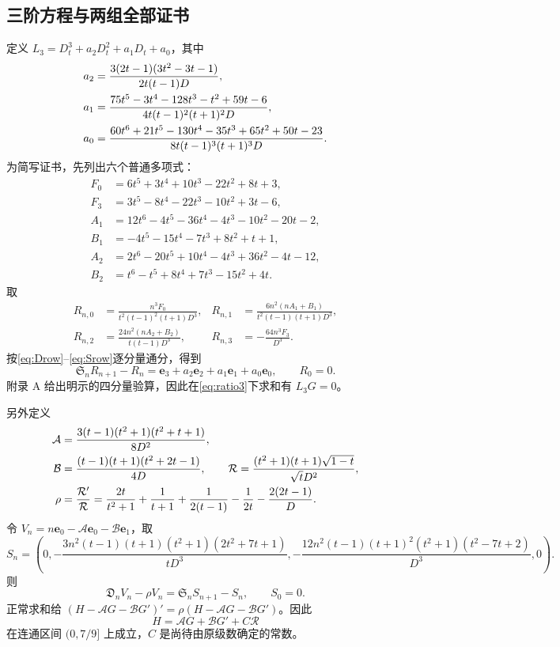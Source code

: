 \documentclass[11pt,a4paper]{article}
\numberwithin{equation}{section}
\theoremstyle{remark}\newtheorem{remark}[theorem]{说明}
\newcommand{\ee}{\boldsymbol e}
\newcommand{\RR}{\mathcal R}
\newcommand{\Afun}{\mathcal A}
\newcommand{\BB}{\mathcal B}
\newcommand{\Dop}{\mathfrak D}
\newcommand{\Sop}{\mathfrak S}
\begin{document}
\subsection{三阶方程与两组全部证书}
定义 $L_3=D_t^3+a_2D_t^2+a_1D_t+a_0$，其中
\begin{align}
 a_2&=\frac{3(2t-1)(3t^2-3t-1)}{2t(t-1)D},\notag\\
 a_1&=\frac{75t^5-3t^4-128t^3-t^2+59t-6}{4t(t-1)^2(t+1)^2D},\label{eq:L3}\\
 a_0&=\frac{60t^6+21t^5-130t^4-35t^3+65t^2+50t-23}{8t(t-1)^3(t+1)^3D}.\notag
\end{align}
为简写证书，先列出六个普通多项式：
\begin{align*}
 F_0&=6t^5+3t^4+10t^3-22t^2+8t+3,\\
 F_3&=3t^5-8t^4-22t^3-10t^2+3t-6,\\
 A_1&=12t^6-4t^5-36t^4-4t^3-10t^2-20t-2,\\
 B_1&=-4t^5-15t^4-7t^3+8t^2+t+1,\\
 A_2&=2t^6-20t^5+10t^4-4t^3+36t^2-4t-12,\\
 B_2&=t^6-t^5+8t^4+7t^3-15t^2+4t.
\end{align*}
取
\begin{equation}\label{eq:R3}
 \begin{aligned}
 R_{n,0}&=\frac{n^3F_0}{t^2(t-1)^2(t+1)D^3},&
 R_{n,1}&=\frac{6n^2(nA_1+B_1)}{t^2(t-1)(t+1)D^3},\\
 R_{n,2}&=\frac{24n^2(nA_2+B_2)}{t(t-1)D^3},&
 R_{n,3}&=-\frac{64n^3F_3}{D^3}.
 \end{aligned}
\end{equation}
按\eqref{eq:Drow}--\eqref{eq:Srow}逐分量通分，得到
\begin{equation}\label{eq:cert3}
 \Sop_nR_{n+1}-R_n=\ee_3+a_2\ee_2+a_1\ee_1+a_0\ee_0,\qquad R_0=0.
\end{equation}
附录 A 给出明示的四分量验算，因此在\eqref{eq:ratio3}下求和有 $L_3G=0$。

另外定义
\begin{align}
 \Afun&=\frac{3(t-1)(t^2+1)(t^2+t+1)}{8D^2},\notag\\
 \BB&=\frac{(t-1)(t+1)(t^2+2t-1)}{4D},\qquad
 \RR=\frac{(t^2+1)(t+1)\sqrt{1-t}}{\sqrt tD^2},\label{eq:ABR}\\
 \rho&=\frac{\RR'}{\RR}
 =\frac{2t}{t^2+1}+\frac1{t+1}+\frac1{2(t-1)}-\frac1{2t}-\frac{2(2t-1)}D.\notag
\end{align}
令 $V_n=n\ee_0-\Afun\ee_0-\BB\ee_1$，取
\begin{equation}\label{eq:S3}
 S_n=\left(0,-\frac{3n^2(t-1)(t+1)(t^2+1)(2t^2+7t+1)}{tD^3},
 -\frac{12n^2(t-1)(t+1)^2(t^2+1)(t^2-7t+2)}{D^3},0\right).
\end{equation}
则
\begin{equation}\label{eq:normal3cert}
 \Dop_nV_n-\rho V_n=\Sop_nS_{n+1}-S_n,\qquad S_0=0.
\end{equation}
正常求和给 $(H-\Afun G-\BB G')'=\rho(H-\Afun G-\BB G')$。因此
\begin{equation}\label{eq:H3general}
 H=\Afun G+\BB G'+C\RR
\end{equation}
在连通区间 $(0,7/9]$ 上成立，$C$ 是尚待由原级数确定的常数。
\end{document}
